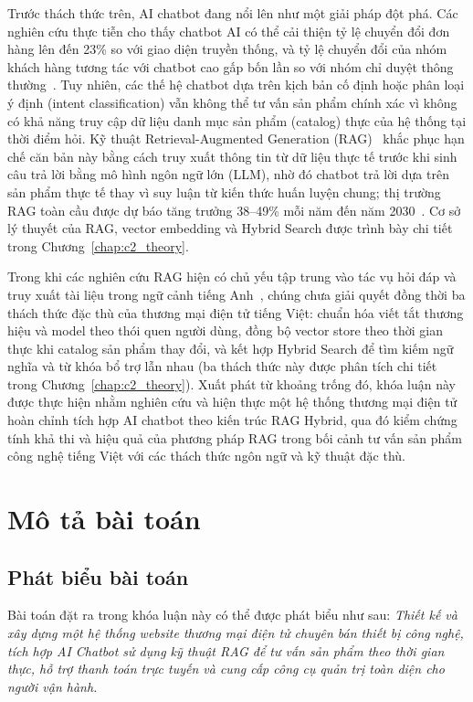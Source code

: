 Trước thách thức trên, AI chatbot đang nổi lên như một giải pháp đột phá. Các nghiên cứu thực tiễn cho thấy chatbot AI có thể cải thiện tỷ lệ chuyển đổi đơn hàng lên đến 23\% so với giao diện truyền thống, và tỷ lệ chuyển đổi của nhóm khách hàng tương tác với chatbot cao gấp bốn lần so với nhóm chỉ duyệt thông thường~\cite{glassix2024}. Tuy nhiên, các thế hệ chatbot dựa trên kịch bản cố định hoặc phân loại ý định (intent classification) vẫn không thể tư vấn sản phẩm chính xác vì không có khả năng truy cập dữ liệu danh mục sản phẩm (catalog) thực của hệ thống tại thời điểm hỏi. Kỹ thuật Retrieval-Augmented Generation (RAG)~\cite{lewis2020rag} khắc phục hạn chế căn bản này bằng cách truy xuất thông tin từ dữ liệu thực tế trước khi sinh câu trả lời bằng mô hình ngôn ngữ lớn (LLM), nhờ đó chatbot trả lời dựa trên sản phẩm thực tế thay vì suy luận từ kiến thức huấn luyện chung; thị trường RAG toàn cầu được dự báo tăng trưởng 38--49\% mỗi năm đến năm 2030~\cite{marketsandmarkets_rag2025}. Cơ sở lý thuyết của RAG, vector embedding và Hybrid Search được trình bày chi tiết trong Chương~\ref{chap:c2_theory}.

Trong khi các nghiên cứu RAG hiện có chủ yếu tập trung vào tác vụ hỏi đáp và truy xuất tài liệu trong ngữ cảnh tiếng Anh~\cite{lewis2020rag,gao2023retrieval}, chúng chưa giải quyết đồng thời ba thách thức đặc thù của thương mại điện tử tiếng Việt: chuẩn hóa viết tắt thương hiệu và model theo thói quen người dùng, đồng bộ vector store theo thời gian thực khi catalog sản phẩm thay đổi, và kết hợp Hybrid Search để tìm kiếm ngữ nghĩa và từ khóa bổ trợ lẫn nhau (ba thách thức này được phân tích chi tiết trong Chương~\ref{chap:c2_theory}). Xuất phát từ khoảng trống đó, khóa luận này được thực hiện nhằm nghiên cứu và hiện thực một hệ thống thương mại điện tử hoàn chỉnh tích hợp AI chatbot theo kiến trúc RAG Hybrid, qua đó kiểm chứng tính khả thi và hiệu quả của phương pháp RAG trong bối cảnh tư vấn sản phẩm công nghệ tiếng Việt với các thách thức ngôn ngữ và kỹ thuật đặc thù.

\section{Mô tả bài toán}
\label{sec:c1_problem}

\subsection{Phát biểu bài toán}

Bài toán đặt ra trong khóa luận này có thể được phát biểu như sau: \textit{Thiết kế và xây dựng một hệ thống website thương mại điện tử chuyên bán thiết bị công nghệ, tích hợp AI Chatbot sử dụng kỹ thuật RAG để tư vấn sản phẩm theo thời gian thực, hỗ trợ thanh toán trực tuyến và cung cấp công cụ quản trị toàn diện cho người vận hành.}

